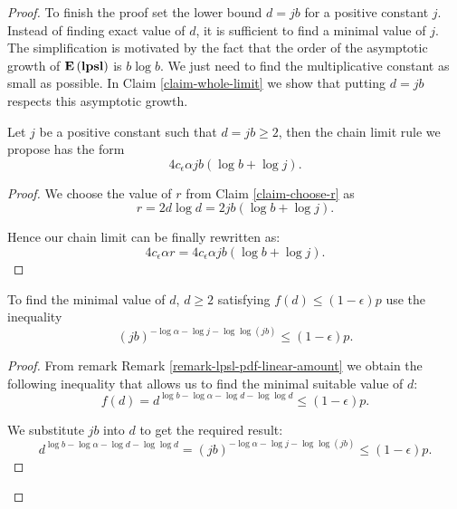 \begin{proof}
To finish the proof set the lower bound $d = j b$ for a positive constant $j$. Instead of finding exact value of $d$, it is sufficient to find a minimal value of $j$. The simplification is motivated by the fact that the order of the asymptotic growth of $\mathbf{E}\left(\mathbf{lpsl}\right)$ is $b \log b$. We just need to find the multiplicative constant as small as possible. In Claim \ref{claim-whole-limit} we show that putting $d = jb$ respects this asymptotic growth.

\begin{claim}
\label{claim-whole-limit}
Let $j$ be a positive constant such that $d = jb \geq 2 $, then the chain limit rule we propose has the form \[ 4 c_\epsilon \alpha j b (\log b + \log j) \text{.} \]
\end{claim}
\begin{proof}
We choose the value of $r$ from Claim \ref{claim-choose-r} as
\[
	r = 2 d \log d = 2 j b (\log b + \log j) \text{.}
\]

Hence our chain limit can be finally rewritten as:
\[
	4 c_\epsilon \alpha r = 4 c_\epsilon \alpha j b (\log b + \log j) \text{.}
\]
\end{proof}

\begin{claim}
To find the minimal value of $d$, $d \geq 2$ satisfying $f(d) \leq (1 - \epsilon) p$ use the inequality
\begin{equation}
\label{inequality-formula-j}
	\left(j b\right)^{-\log \alpha -\log j - \log \log (j b)} \leq (1 - \epsilon)p \text{.}
\end{equation}
\end{claim}
\begin{proof}
From remark Remark \ref{remark-lpsl-pdf-linear-amount} we obtain the following inequality that allows us to find the minimal suitable value of $d$:
\[
	f(d) = d ^ {\log b - \log \alpha - \log d - \log \log d} \leq (1 - \epsilon) p \text{.}
\]

We substitute $j b$ into $d$ to get the required result:
\[
	d ^ {\log b - \log \alpha - \log d - \log \log d} = \left(j b\right)^{-\log \alpha -\log j - \log \log (j b)} \leq (1 - \epsilon)p \text{.}
\]
\end{proof}


\end{proof}
